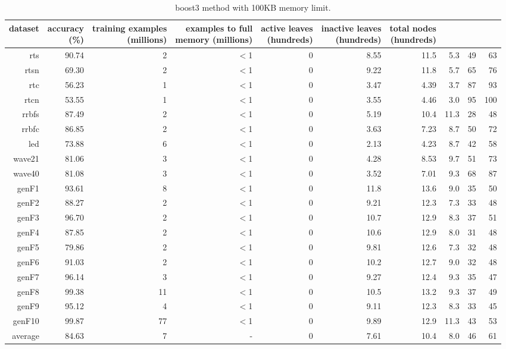 \begin{table}
\caption{{\sc boost3} method with 100KB memory limit.}
\label{tab:boost3-100k}
\centering
\begin{tabular}{|r|r|r|r|r|r|r|r|r|r|}
\hline
dataset	&
\rotatebox{90}{\parbox{9em}{accuracy\\(\%)}} &
\rotatebox{90}{\parbox{9em}{training examples\\(millions)}} &
\rotatebox{90}{\parbox{9em}{examples to full\\memory (millions)}} &
\rotatebox{90}{\parbox{9em}{active leaves\\(hundreds)}} &
\rotatebox{90}{\parbox{9em}{inactive leaves\\(hundreds)}} &
\rotatebox{90}{\parbox{9em}{total nodes\\(hundreds)}} &
\rotatebox{90}{\parbox{9em}{average tree depth}}	&
\rotatebox{90}{\parbox{9em}{training speed (\%)}} &
\rotatebox{90}{\parbox{9em}{prediction speed (\%)}} \\
\hline
{\sc rts} & 90.74 & 2 & $<$1 & 0 & 8.55 & 11.5 & 5.3 & 49 & 63 \\
{\sc rtsn} & 69.30 & 2 & $<$1 & 0 & 9.22 & 11.8 & 5.7 & 65 & 76 \\
{\sc rtc} & 56.23 & 1 & $<$1 & 0 & 3.47 & 4.39 & 3.7 & 87 & 93 \\
{\sc rtcn} & 53.55 & 1 & $<$1 & 0 & 3.55 & 4.46 & 3.0 & 95 & 100 \\
{\sc rrbfs} & 87.49 & 2 & $<$1 & 0 & 5.19 & 10.4 & 11.3 & 28 & 48 \\
{\sc rrbfc} & 86.85 & 2 & $<$1 & 0 & 3.63 & 7.23 & 8.7 & 50 & 72 \\
{\sc led} & 73.88 & 6 & $<$1 & 0 & 2.13 & 4.23 & 8.7 & 42 & 58 \\
{\sc wave21} & 81.06 & 3 & $<$1 & 0 & 4.28 & 8.53 & 9.7 & 51 & 73 \\
{\sc wave40} & 81.08 & 3 & $<$1 & 0 & 3.52 & 7.01 & 9.3 & 68 & 87 \\
{\sc genF1} & 93.61 & 8 & $<$1 & 0 & 11.8 & 13.6 & 9.0 & 35 & 50 \\
{\sc genF2} & 88.27 & 2 & $<$1 & 0 & 9.21 & 12.3 & 7.3 & 33 & 48 \\
{\sc genF3} & 96.70 & 2 & $<$1 & 0 & 10.7 & 12.9 & 8.3 & 37 & 51 \\
{\sc genF4} & 87.85 & 2 & $<$1 & 0 & 10.6 & 12.9 & 8.0 & 31 & 48 \\
{\sc genF5} & 79.86 & 2 & $<$1 & 0 & 9.81 & 12.6 & 7.3 & 32 & 48 \\
{\sc genF6} & 91.03 & 2 & $<$1 & 0 & 10.2 & 12.7 & 9.0 & 32 & 48 \\
{\sc genF7} & 96.14 & 3 & $<$1 & 0 & 9.27 & 12.4 & 9.3 & 35 & 47 \\
{\sc genF8} & 99.38 & 11 & $<$1 & 0 & 10.5 & 13.2 & 9.3 & 37 & 49 \\
{\sc genF9} & 95.12 & 4 & $<$1 & 0 & 9.11 & 12.3 & 8.3 & 33 & 45 \\
{\sc genF10} & 99.87 & 77 & $<$1 & 0 & 9.89 & 12.9 & 11.3 & 43 & 53 \\
\hline
average & 84.63 & 7 &  -  & 0 & 7.61 & 10.4 & 8.0 & 46 & 61 \\
\hline
\end{tabular}
\end{table}
